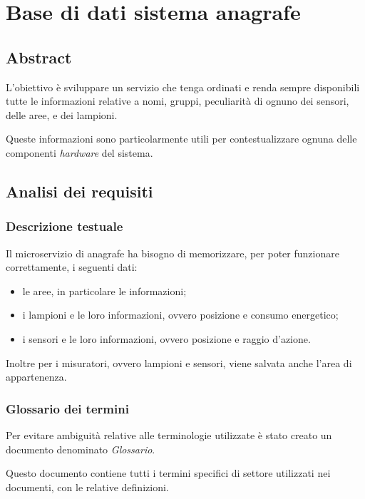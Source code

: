 \section{Base di dati sistema anagrafe}\label{sec:sbd-sistema-anagrafe}

\subsection{Abstract}

L'obiettivo è sviluppare un servizio che tenga ordinati e renda sempre disponibili tutte le informazioni relative a nomi, gruppi, peculiarità di ognuno dei sensori, delle aree, e dei lampioni. 

Queste informazioni sono particolarmente utili per contestualizzare ognuna delle componenti {\it{hardware}} del sistema.

\subsection{Analisi dei requisiti}

\subsubsection{Descrizione testuale}

Il microservizio di anagrafe ha bisogno di memorizzare, per poter funzionare correttamente, i seguenti dati:

\begin{itemize}
    \item le aree, in particolare le informazioni;
    \item i lampioni e le loro informazioni, ovvero posizione e consumo energetico;
    \item i sensori e le loro informazioni, ovvero posizione e raggio d'azione.
\end{itemize}

Inoltre per i misuratori, ovvero lampioni e sensori, viene salvata anche l'area di appartenenza.

\subsubsection{Glossario dei termini}

Per evitare ambiguità relative alle terminologie utilizzate è stato creato un documento denominato \textit{Glossario}.

Questo documento contiene tutti i termini specifici di settore utilizzati nei documenti, con le relative definizioni.

